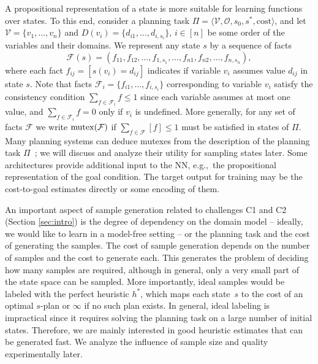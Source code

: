 A propositional representation of a state is more suitable for learning functions over states. To this end, consider a planning task $\Pi=\langle\mathcal{V},\mathcal{O},s_0,s^*, \text{cost}\rangle$, and let $\mathcal{V}=\{v_1,\ldots,v_n\}$ and $D(v_i)=\{d_{i1},\ldots,d_{i,s_i}\}$, $i\in[n]$ be some order of the variables and their domains. We represent any state $s$ by a sequence of facts $$\mathcal{F}(s)=(f_{11},f_{12},\ldots,f_{1,s_1},\ldots,f_{n1},f_{n2},\ldots,f_{n,s_n}),$$ where each fact $f_{ij}=[s(v_i)=d_{ij}]$ indicates if variable $v_i$ assumes value $d_{ij}$ in state $s$. Note that facts $\mathcal{F}_i=\{f_{i1},\ldots,f_{i,s_i}\}$ corresponding to variable $v_i$ satisfy the consistency condition $\sum_{f\in \mathcal{F}_i} f\leq 1$ since each variable assumes at most one value, and $\sum_{f\in \mathcal{F}_i} f=0$ only if $v_i$ is undefined. More generally, for any set of facts $\mathcal{F}$ we write $\operatorname{mutex}(\mathcal{F})$ if $\sum_{f\in \mathcal{F}} [f]\leq 1$ must be satisfied in states of $\Pi$. Many planning systems can deduce mutexes from the description of the planning task $\Pi$~\cite{Helmert/2009}; we will discuss and analyze their utility for sampling states later. Some architectures provide additional input to the NN, e.g.,~the propositional representation of the goal condition. The target output for training may be the cost-to-goal estimates directly or some encoding of them.

An important aspect of sample generation related to challenges C1 and C2 (Section \ref{sec:intro}) is the degree of dependency on the domain model -- ideally, we would like to learn in a model-free setting -- or the planning task and the cost of generating the samples. The cost of sample generation depends on the number of samples and the cost to generate each. This generates the problem of deciding how many samples are required, although in general, only a very small part of the state space can be sampled. More importantly, ideal samples would be labeled with the perfect heuristic $h^*$, which maps each state~$s$ to the cost of an optimal $s$-plan or $\infty$ if no such plan exists. In general, ideal labeling is impractical since it requires solving the planning task on a large number of initial states. Therefore, we are mainly interested in good heuristic estimates that can be generated fast. We analyze the influence of sample size and quality experimentally later.

